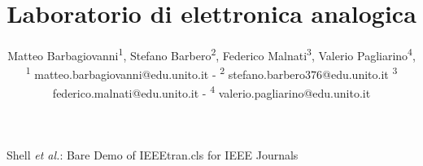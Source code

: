 \documentclass[journal]{IEEEtran}
\begin{document}
\title{Laboratorio di elettronica analogica\\ 
}

\author{\begin{center}Matteo Barbagiovanni\textsuperscript{1},
        Stefano Barbero\textsuperscript{2},
        Federico Malnati\textsuperscript{3},
        Valerio Pagliarino\textsuperscript{4},
        {\small \\
        \textsuperscript{1}
        matteo.barbagiovanni@edu.unito.it -
        \textsuperscript{2}
        stefano.barbero376@edu.unito.it
        \textsuperscript{3}
        federico.malnati@edu.unito.it -
        \textsuperscript{4}
        valerio.pagliarino@edu.unito.it}
        \end{center}}%
        
{Shell \MakeLowercase{\textit{et al.}}: Bare Demo of IEEEtran.cls for IEEE Journals}

\maketitle
\end{document}
